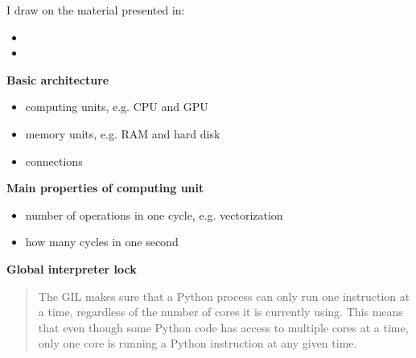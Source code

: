 \begin{frame} I draw on the material presented in:\vspace{0.3cm}

\begin{itemize}\setlength\itemsep{1em}
  \item {}
  \item {}
\end{itemize}
\end{frame}
\begin{frame}\textbf{Basic architecture}\vspace{0.3cm}

\begin{itemize}\setlength\itemsep{1em}
    \item computing units, e.g. CPU and GPU
    \item memory units, e.g. RAM and hard disk
    \item connections
\end{itemize}

\end{frame}
\begin{frame}\textbf{Main properties of computing unit}\vspace{0.3cm}

\begin{itemize}\setlength\itemsep{1em}
    \item number of operations in one cycle, e.g. vectorization
    \item how many cycles in one second
\end{itemize}

\end{frame}
\begin{frame}\textbf{Global interpreter lock}\vspace{0.3cm}

\begin{quote} The GIL makes sure that a Python process can only run one instruction at a time, regardless of the number of cores it is currently using. This means that even though some Python code has access to multiple cores at a time, only one core is running a Python instruction at any given time.
\end{quote}
\end{frame}
